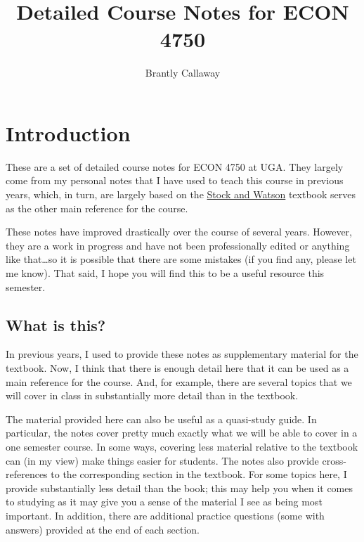 \documentclass[
  letterpaper,
  DIV=11,
  numbers=noendperiod]{scrreprt}
\title{Detailed Course Notes for ECON 4750}
\author{Brantly Callaway}
\date{}
\renewcommand*\contentsname{Table of contents}
\newcommand\contentsname{Table of contents}
\begin{document}
\maketitle

\renewcommand*\contentsname{Table of contents}
{
\hypersetup{linkcolor=}
\setcounter{tocdepth}{2}
\tableofcontents
}


\chapter{Introduction}\label{introduction}

These are a set of detailed course notes for ECON 4750 at UGA. They
largely come from my personal notes that I have used to teach this
course in previous years, which, in turn, are largely based on the
\href{https://www.amazon.com/Introduction-Econometrics-4th-Pearson-Economics/dp/0134461991/ref=sr_1_1?dchild=1&keywords=stock+and+watson&qid=1618424276&s=books&sr=1-1}{Stock
and Watson} textbook serves as the other main reference for the course.

These notes have improved drastically over the course of several years.
However, they are a work in progress and have not been professionally
edited or anything like that\ldots so it is possible that there are some
mistakes (if you find any, please let me know). That said, I hope you
will find this to be a useful resource this semester.

\section{What is this?}\label{what-is-this}

In previous years, I used to provide these notes as supplementary
material for the textbook. Now, I think that there is enough detail here
that it can be used as a main reference for the course. And, for
example, there are several topics that we will cover in class in
substantially more detail than in the textbook.

The material provided here can also be useful as a quasi-study guide. In
particular, the notes cover pretty much exactly what we will be able to
cover in a one semester course. In some ways, covering less material
relative to the textbook can (in my view) make things easier for
students. The notes also provide cross-references to the corresponding
section in the textbook. For some topics here, I provide substantially
less detail than the book; this may help you when it comes to studying
as it may give you a sense of the material I see as being most
important. In addition, there are additional practice questions (some
with answers) provided at the end of each section.
\end{document}
